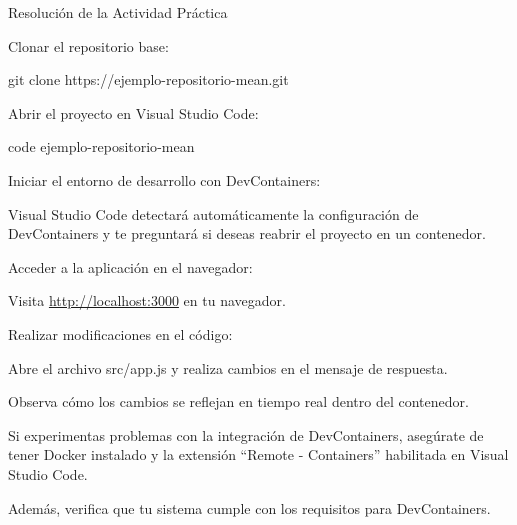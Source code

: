 \documentclass[
  a4paper,
  DIV=11,
  numbers=noendperiod,
  onepage,
  openany]{scrreprt}
\newenvironment{Shaded}{\begin{snugshade}}{\end{snugshade}}
\newcommand{\ExtensionTok}[1]{\textcolor[rgb]{0.00,0.23,0.31}{#1}}
\newcommand{\FunctionTok}[1]{\textcolor[rgb]{0.28,0.35,0.67}{#1}}
\newcommand{\NormalTok}[1]{\textcolor[rgb]{0.00,0.23,0.31}{#1}}
\begin{document}
Resolución de la Actividad Práctica

Clonar el repositorio base:

\begin{Shaded}
\begin{Highlighting}[]
\FunctionTok{git}\NormalTok{ clone https://ejemplo{-}repositorio{-}mean.git}
\end{Highlighting}
\end{Shaded}

Abrir el proyecto en Visual Studio Code:

\begin{Shaded}
\begin{Highlighting}[]
\ExtensionTok{code}\NormalTok{ ejemplo{-}repositorio{-}mean}
\end{Highlighting}
\end{Shaded}

Iniciar el entorno de desarrollo con DevContainers:

Visual Studio Code detectará automáticamente la configuración de
DevContainers y te preguntará si deseas reabrir el proyecto en un
contenedor.

Acceder a la aplicación en el navegador:

Visita \url{http://localhost:3000} en tu navegador.

Realizar modificaciones en el código:

Abre el archivo src/app.js y realiza cambios en el mensaje de respuesta.

Observa cómo los cambios se reflejan en tiempo real dentro del
contenedor.

\begin{tcolorbox}[enhanced jigsaw, opacityback=0, titlerule=0mm, bottomtitle=1mm, arc=.35mm, toptitle=1mm, breakable, colframe=quarto-callout-tip-color-frame, left=2mm, leftrule=.75mm, coltitle=black, rightrule=.15mm, toprule=.15mm, colbacktitle=quarto-callout-tip-color!10!white, colback=white, bottomrule=.15mm, title=\textcolor{quarto-callout-tip-color}{\faLightbulb}\hspace{0.5em}{Tip}, opacitybacktitle=0.6]

Si experimentas problemas con la integración de DevContainers, asegúrate
de tener Docker instalado y la extensión ``Remote - Containers''
habilitada en Visual Studio Code.

Además, verifica que tu sistema cumple con los requisitos para
DevContainers.

\end{tcolorbox}
\end{document}

